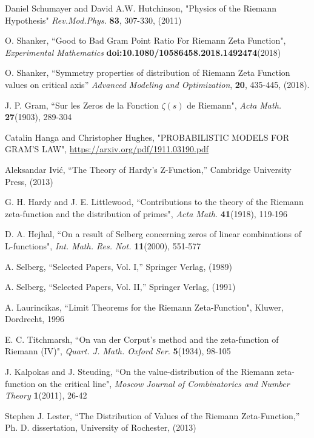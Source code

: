 \documentclass[twoside]{article}
\begin{document}
\begin{thebibliography}{10}
 Daniel Schumayer and David A.W. Hutchinson,
"Physics of the Riemann Hypothesis"
{\it Rev.Mod.Phys.} {\bf83}, 307-330, (2011)

 O. Shanker, 
``Good to Bad Gram Point Ratio For Riemann Zeta Function",
{\it Experimental Mathematics} {\bf doi:10.1080/10586458.2018.1492474}(2018)

 O. Shanker, 
``Symmetry properties of distribution of Riemann Zeta Function values on critical axis''
{\it Advanced Modeling and Optimization}, {\bf 20}, 435-445, (2018). 

 J. P. Gram, 
``Sur les Zeros de la Fonction  $\zeta ( s )$  de Riemann",
{\it Acta Math.} {\bf27}(1903), 289-304



 Catalin Hanga and Christopher Hughes,
"PROBABILISTIC MODELS FOR GRAM’S LAW", \url {https://arxiv.org/pdf/1911.03190.pdf}


 Aleksandar Ivi\'c, ``The Theory of Hardy's Z-Function,''
Cambridge University Press,  (2013)

 G. H. Hardy and J. E. Littlewood,
``Contributions to the theory of the Riemann
zeta-function and the distribution of primes",
{\it Acta Math.} {\bf41}(1918), 119-196

 D. A. Hejhal,
``On a result of Selberg concerning zeros of linear combinations
of L-functions", 
{\it Int. Math. Res. Not.} {\bf11}(2000), 551-577

 A. Selberg, ``Selected Papers, Vol. I,''
Springer Verlag,  (1989)

 A. Selberg, ``Selected Papers, Vol. II,''
Springer Verlag,  (1991)



 A. Laurincikas,
``Limit Theorems for the Riemann Zeta-Function",
Kluwer, Dordrecht, 1996

 E. C. Titchmarsh,
``On van der Corput's method and the zeta-function of Riemann (IV)",
{\it Quart. J. Math. Oxford Ser.} {\bf5}(1934), 98-105

 J. Kalpokas and J. Steuding,
``On the value-distribution of the Riemann zeta-function on the critical line", 
{\it Moscow Journal of Combinatorics and
Number Theory} {\bf1}(2011), 26-42

 Stephen J. Lester, ``The Distribution of Values of the
Riemann Zeta-Function,''
Ph. D. dissertation, University of Rochester,  (2013)


\end{thebibliography}
\end{document}

